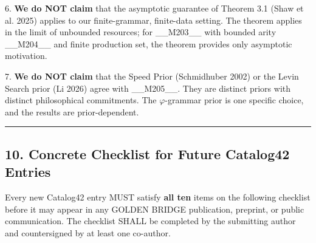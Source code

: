 6. \textbf{We do NOT claim} that the asymptotic guarantee of Theorem 3.1 (Shaw et al. 2025) applies to our finite-grammar, finite-data setting. The theorem applies in the limit of unbounded resources; for \_\_M203\_\_ with bounded arity \_\_M204\_\_ and finite production set, the theorem provides only asymptotic motivation.

7. \textbf{We do NOT claim} that the Speed Prior (Schmidhuber 2002) or the Levin Search prior (Li 2026) agree with \_\_M205\_\_. They are distinct priors with distinct philosophical commitments. The $\varphi$-grammar prior is one specific choice, and the results are prior-dependent.

\noindent\rule{\textwidth}{0.4pt}

\subsection{10. Concrete Checklist for Future Catalog42 Entries}

Every new Catalog42 entry MUST satisfy \textbf{all ten} items on the following checklist before it may appear in any GOLDEN BRIDGE publication, preprint, or public communication. The checklist SHALL be completed by the submitting author and countersigned by at least one co-author.

